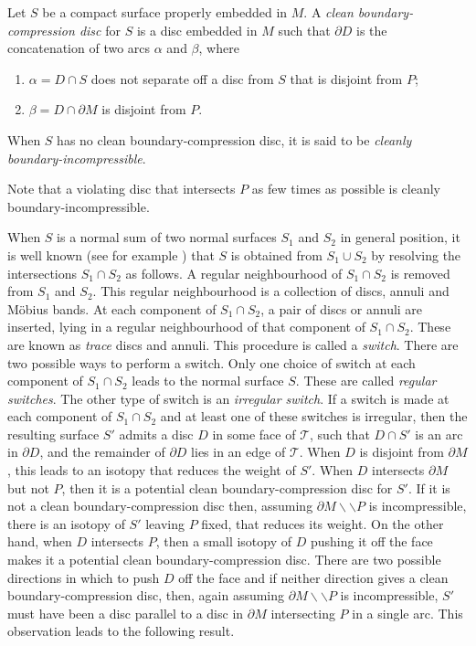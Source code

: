 \documentclass[oneside]{amsart}
\numberwithin{equation}{section}
\theoremstyle{plain}
\theoremstyle{definition}
\newcommand{\cut}{\backslash\backslash}
\begin{document}
Let $S$ be a compact surface properly embedded in $M$. A \emph{clean boundary-compression disc} for $S$
is a disc embedded in $M$ such that $\partial D$ is the concatenation of two arcs $\alpha$ and $\beta$, where
\begin{enumerate}
\item $\alpha = D \cap S$ does not separate off a disc from $S$ that is disjoint from $P$;
\item $\beta = D \cap \partial M$ is disjoint from $P$.
\end{enumerate}
When $S$ has no clean boundary-compression disc, it is said to be \emph{cleanly boundary-incompressible}.

Note that a violating disc that intersects $P$ as few times as possible is cleanly boundary-incompressible.

When $S$ is a normal sum of two normal surfaces $S_1$ and $S_2$ in general position, 
it is well known (see for example \cite[Section 3.2.2]{Matveev}) that $S$ is obtained from $S_1 \cup S_2$ by resolving the intersections $S_1 \cap S_2$
as follows. A regular neighbourhood of $S_1 \cap S_2$ is removed from $S_1$ and $S_2$. This
regular neighbourhood is a collection of discs, annuli and M\"obius bands. At each component of $S_1 \cap S_2$,
a pair of discs or annuli are inserted, lying in a regular neighbourhood of that component of $S_1 \cap S_2$. These
are known as \emph{trace} discs and annuli.
This procedure is called a \emph{switch}. There are two possible ways to perform a switch. Only one choice of
switch at each component of $S_1 \cap S_2$ leads to the normal surface $S$. These are called
\emph{regular switches}. The other type of switch is an \emph{irregular switch}. If a switch is made at each
component of $S_1 \cap S_2$ and at least one of these switches is irregular, then the resulting surface $S'$
admits a disc $D$ in some face of $\mathcal{T}$, such that $D \cap S'$ is an arc in $\partial D$, and the
remainder of $\partial D$ lies in an edge of $\mathcal{T}$. When $D$ is disjoint from $\partial M$,
this leads to an isotopy that reduces the weight of $S'$. When $D$ intersects $\partial M$ but not $P$,
then it is a potential clean boundary-compression disc for $S'$. If it is not a clean boundary-compression disc
then, assuming $\partial M \cut P$ is incompressible, there is an isotopy of $S'$ leaving $P$ fixed,
that reduces its weight. On the other hand, when $D$ intersects $P$, then a small
isotopy of $D$ pushing it off the face makes it a potential clean boundary-compression disc.
There are two possible directions in which to push $D$ off the face and if neither direction gives
a clean boundary-compression disc, then, again assuming $\partial M \cut P$ is incompressible, 
$S'$ must have been a disc parallel to a disc in $\partial M$ intersecting $P$ in a single arc.
This observation leads to the following result.
\end{document}

